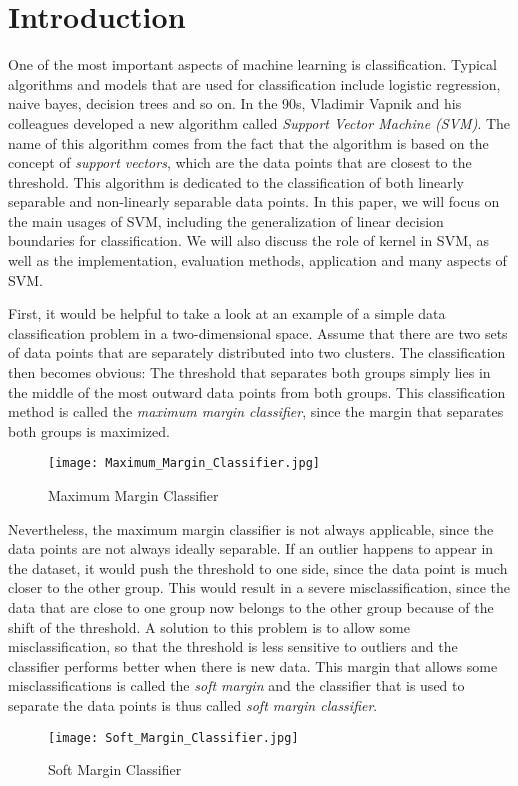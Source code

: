 
\section{Introduction}
One of the most important aspects of machine learning is classification. Typical algorithms and models
that are used for classification include logistic regression, naive bayes, decision trees and so on. In the 90s, 
Vladimir Vapnik and his colleagues developed a new algorithm called \emph{Support Vector Machine (SVM)}.
The name of this algorithm comes from the fact that the algorithm is based on the concept of \emph{support vectors},
which are the data points that are closest to the threshold. This algorithm is dedicated to the classification
of both linearly separable and non-linearly separable data points. In this paper,
we will focus on the main usages of SVM, including the generalization of linear decision boundaries for classification.
We will also discuss the role of kernel in SVM, as well as the implementation, evaluation methods, application and many aspects of SVM.


First, it would be helpful to take a look at an example of a simple data classification problem in a two-dimensional space.
Assume that there are two sets of data points that are separately distributed into two clusters. The classification then
becomes obvious: The threshold that separates both groups simply lies in the middle of the most outward data points
from both groups. This classification method is called the \emph{maximum margin classifier}, since the margin that separates both groups is maximized.

\begin{figure}[h]%
    \begin{center}%
        \texttt{[image: Maximum\_Margin\_Classifier.jpg]}%
        \caption{Maximum Margin Classifier \cite{imgintro}}\label{fig:}%
    \end{center}%
\end{figure}
Nevertheless, the maximum margin classifier is not always applicable, since the data points are not always ideally separable. If an outlier happens to appear in the dataset, it would push the threshold to one side, since the data point
is much closer to the other group. This would result in a severe misclassification, since the data that are close to one
group now belongs to the other group because of the shift of the threshold. A solution to this problem is to allow some
misclassification, so that the threshold is less sensitive to outliers and the classifier performs better
when there is new data. This margin that allows some misclassifications is called the \emph{soft margin} and
the classifier that is used to separate the data points is thus called \emph{soft margin classifier}.
\begin{figure}[h]%
    \begin{center}%
        \texttt{[image: Soft\_Margin\_Classifier.jpg]}%
        \caption{Soft Margin Classifier \cite{imgintro}}\label{fig:}%
    \end{center}%
\end{figure}


